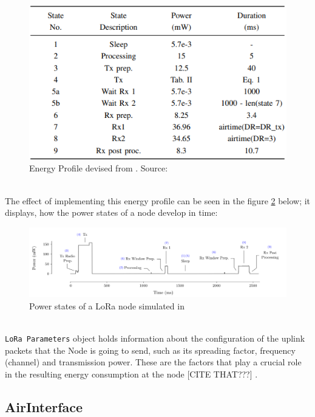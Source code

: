 \begin{figure}[h!]
  \centering
  \includegraphics[scale=0.7]{figures/energy_profile.PNG}
  \caption{Energy Profile devised from \cite{energy_profile}. Source: \cite{simulator}}
  \label{fig:energy_profile}
\end{figure}\\

The effect of implementing this energy profile can be seen in the figure \ref{fig:power_states} below; it displays, how the power states of a node develop in time:

\begin{figure}[h!]
  \centering
  \hspace*{-1cm}  
  \includegraphics[scale=0.5]{figures/class A 2.PNG}
  \caption{Power states of a LoRa node simulated in \cite{simulator}}
  \label{fig:power_states}
\end{figure}\\

\texttt{LoRa Parameters} object holds information about the configuration of the uplink packets that the Node is going to send, such as its spreading factor, frequency (channel) and transmission power. These are the factors that play a crucial role in the resulting energy consumption at the node [CITE THAT???] .

\subsection{AirInterface}

